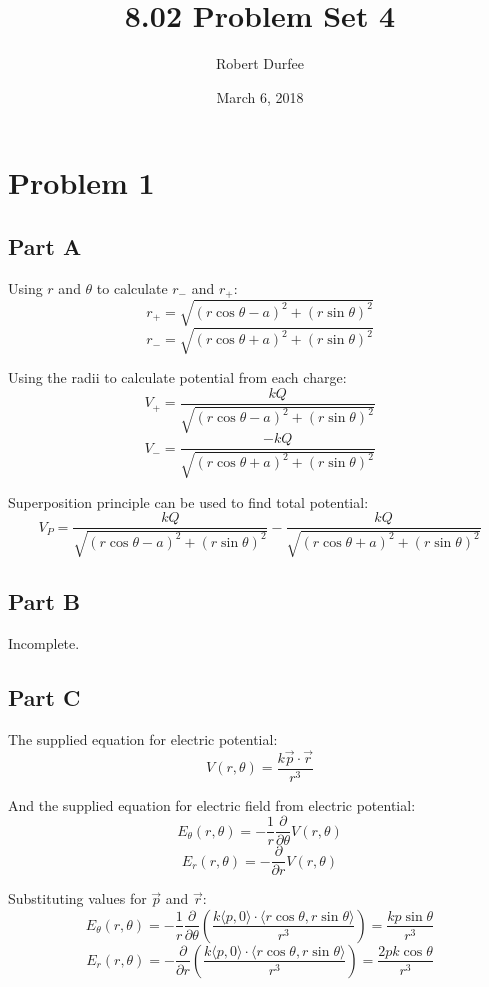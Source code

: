 \documentclass{article}
\title{ 8.02 Problem Set 4 }
\author{ Robert Durfee }
\date{ March 6, 2018 }
\begin{document}
\maketitle

\section{ Problem 1 }

\subsection*{Part A}

Using $r$ and $\theta$ to calculate $r_{-}$ and $r_{+}$:
$$ r_{+} = \sqrt{(r \cos \theta - a)^{2} + (r \sin \theta)^{2}} $$
$$ r_{-} = \sqrt{(r \cos \theta + a)^{2} + (r \sin \theta)^{2}} $$

Using the radii to calculate potential from each charge:
$$ V_{+} = \frac{ k Q }{ \sqrt{(r \cos \theta - a)^{2} + (r \sin \theta)^{2}} } $$
$$ V_{-} = \frac{ -k Q }{ \sqrt{(r \cos \theta + a)^{2} + (r \sin \theta)^{2}} } $$

Superposition principle can be used to find total potential:
$$ V_{P} = \frac{ k Q }{ \sqrt{(r \cos \theta - a)^{2} + (r \sin \theta)^{2}} }
- \frac{ k Q }{ \sqrt{(r \cos \theta + a)^{2} + (r \sin \theta)^{2}} }$$

\subsection*{Part B}

Incomplete.

\subsection*{Part C}

The supplied equation for electric potential:
$$ V(r, \theta) = \frac{ k \vec{p} \cdot \vec{r} }{ r^{3} } $$

And the supplied equation for electric field from electric potential:
$$ E_{\theta}(r, \theta) = -\frac{ 1 }{ r } \frac{ \partial}{ \partial \theta }
V(r, \theta) $$
$$ E_{r}(r, \theta) = -\frac{ \partial }{ \partial r } V(r, \theta) $$

Substituting values for $\vec{p}$ and $\vec{r}$:
$$ E_{\theta}(r, \theta) = -\frac{ 1 }{ r } \frac{ \partial }{ \partial \theta }
\left( \frac{ k \langle p, 0 \rangle \cdot \langle r \cos \theta, r \sin \theta
\rangle }{ r^{3} } \right) = \frac{ kp \sin \theta }{ r^{3} }$$
$$ E_{r}(r, \theta) = -\frac{ \partial }{ \partial r } \left( \frac{ k \langle p, 0
\rangle \cdot \langle r \cos \theta, r \sin \theta \rangle}{ r^{3} } \right) =
\frac{ 2 p k \cos \theta }{ r^{3} }$$
\end{document}
